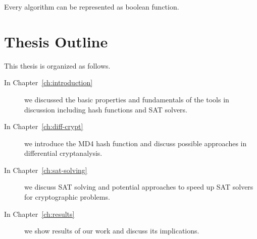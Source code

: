 \begin{theorem}
  Every algorithm can be represented as boolean function.
\end{theorem}

\section{Thesis Outline}
%
This thesis is organized as follows.

\begin{description}
\item[In Chapter~\ref{ch:introduction}] we discussed the basic properties and fundamentals
of the tools in discussion including hash functions and SAT solvers.

\item[In Chapter~\ref{ch:diff-crypt}] we introduce the MD4 hash function and
discuss possible approaches in differential cryptanalysis.

\item[In Chapter~\ref{ch:sat-solving}] we discuss SAT solving and potential
approaches to speed up SAT solvers for cryptographic problems.

\item[In Chapter~\ref{ch:results}] we show results of our work
and discuss its implications.
\end{description}

